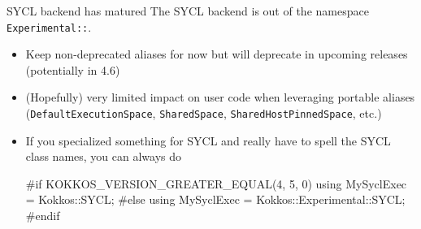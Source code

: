 
\begin{frame}[fragile]{SYCL backend has matured}
The SYCL backend is out of the namespace \texttt{Experimental::}.
\begin{itemize}
\item Keep non-deprecated aliases for now but will deprecate in upcoming releases (potentially in 4.6)
\item (Hopefully) very limited impact on user code when leveraging portable aliases (\texttt{DefaultExecutionSpace}, \texttt{SharedSpace}, \texttt{SharedHostPinnedSpace}, etc.)
\item If you specialized something for SYCL and really have to spell the SYCL class names, you can always do
\begin{code}
#if KOKKOS_VERSION_GREATER_EQUAL(4, 5, 0)
using MySyclExec = Kokkos::SYCL;
#else
using MySyclExec = Kokkos::Experimental::SYCL;
#endif
\end{code}
\end{itemize}

\end{frame}
